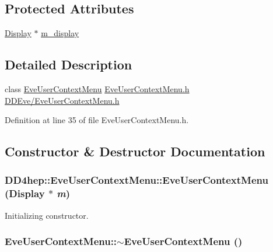 \subsection*{Protected Attributes}
\begin{DoxyCompactItemize}
\item 
\hyperlink{class_d_d4hep_1_1_display}{Display} $\ast$ \hyperlink{class_d_d4hep_1_1_eve_user_context_menu_ab3592e822e14b2d25c4f68553df60cd0}{m\_\-display}
\end{DoxyCompactItemize}


\subsection{Detailed Description}
class \hyperlink{class_d_d4hep_1_1_eve_user_context_menu}{EveUserContextMenu} \hyperlink{_eve_user_context_menu_8h}{EveUserContextMenu.h} \hyperlink{_eve_user_context_menu_8h}{DDEve/EveUserContextMenu.h} 

Definition at line 35 of file EveUserContextMenu.h.

\subsection{Constructor \& Destructor Documentation}
\hypertarget{class_d_d4hep_1_1_eve_user_context_menu_a2ea274ad2ba442a5ecfa2b438ee4d4aa}{
\subsubsection[{EveUserContextMenu}]{\setlength{\rightskip}{0pt plus 5cm}DD4hep::EveUserContextMenu::EveUserContextMenu ({\bf Display} $\ast$ {\em m})}}
\label{class_d_d4hep_1_1_eve_user_context_menu_a2ea274ad2ba442a5ecfa2b438ee4d4aa}


Initializing constructor. \hypertarget{class_d_d4hep_1_1_eve_user_context_menu_a48d1bbc000743f3a363ea230ab4eeb0c}{
\subsubsection[{$\sim$EveUserContextMenu}]{\setlength{\rightskip}{0pt plus 5cm}EveUserContextMenu::$\sim$EveUserContextMenu ()}}
\label{class_d_d4hep_1_1_eve_user_context_menu_a48d1bbc000743f3a363ea230ab4eeb0c}


